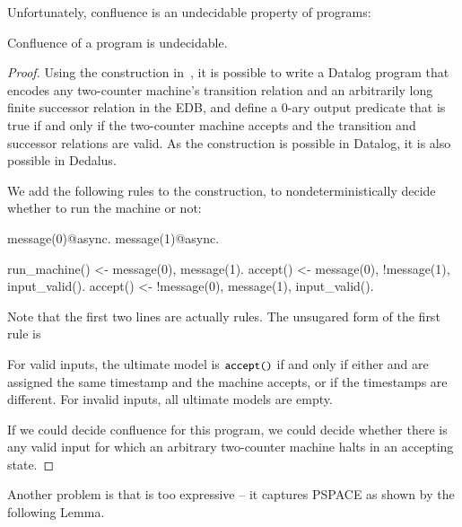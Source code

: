 
Unfortunately, confluence is an undecidable property of \lang programs:

\begin{lemma}
\label{lem:confluence-undecidable}
Confluence of a \lang program is undecidable.
\end{lemma}
\begin{proof}
Using the construction in~\cite{undecidable-datalog}, it is possible to write a Datalog program that encodes any two-counter machine's transition relation and an arbitrarily long finite successor relation in the EDB, and define a 0-ary output predicate  that is true if and only if the two-counter machine accepts and the transition and successor relations are valid.  As the construction is possible in Datalog, it is also possible in Dedalus.

We add the following rules to the construction, to nondeterministically decide whether to run the machine or not:

\begin{Dedalus}
message(0)@async.
message(1)@async.

run_machine() <- message(0), message(1).
accept() <- message(0), !message(1), input_valid().
accept() <- !message(0), message(1), input_valid().
\end{Dedalus}

Note that the first two lines are actually rules.  The unsugared form of the first rule is 

For valid inputs, the ultimate model is ${\dedalus{accept()}}$ if and only if either  and  are assigned the same timestamp and the machine accepts, or if the timestamps are different.  For invalid inputs, all ultimate models are empty.

If we could decide confluence for this program, we could decide whether there is any valid input for which an arbitrary two-counter machine halts in an accepting state.
\end{proof}


Another problem is that \lang is too expressive -- it captures PSPACE as shown by the following Lemma.

